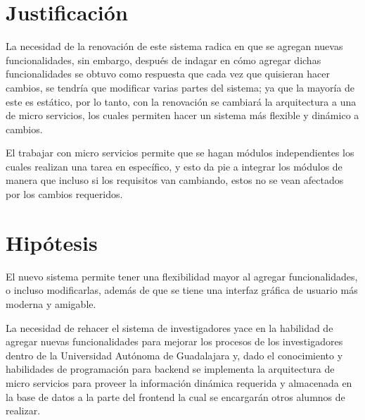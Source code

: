\section{Justificación} \label{justificacion}

    La necesidad de la renovación de este sistema radica en que se agregan nuevas funcionalidades, sin embargo, después de indagar en cómo agregar dichas funcionalidades se obtuvo como respuesta que cada vez que quisieran hacer cambios, se tendría que modificar varias partes del sistema; ya que la mayoría de este es estático, por lo tanto, con la renovación se cambiará la arquitectura a una de micro servicios, los cuales permiten hacer un sistema más flexible y dinámico a cambios.
    
    El trabajar con micro servicios permite que se hagan módulos independientes los cuales realizan una tarea en específico, y esto da pie a integrar los módulos de manera que incluso si los requisitos van cambiando, estos no se vean afectados por los cambios requeridos.

\section{Hipótesis} \label{hipotesis}

    El nuevo sistema permite tener una flexibilidad mayor al agregar funcionalidades, o incluso modificarlas, además de que se tiene una interfaz gráfica de usuario más moderna y amigable.
    
    La necesidad de rehacer el sistema de investigadores yace en la habilidad de agregar nuevas funcionalidades para mejorar los procesos de los investigadores dentro de la Universidad Autónoma de Guadalajara y, dado el conocimiento y habilidades de programación para backend se implementa la arquitectura de micro servicios para proveer la información dinámica requerida y almacenada en la base de datos a la parte del frontend la cual se encargarán otros alumnos de realizar.